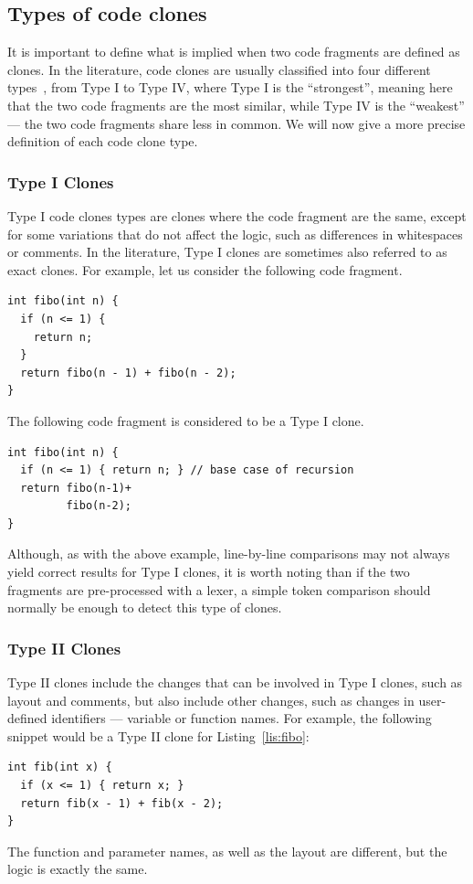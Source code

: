 \subsection{Types of code clones}
It is important to define what is implied when two code fragments are
defined as clones. In the literature, code clones are usually
classified into four different types~\cite{Roy07asurvey}, from Type I to Type IV,
where Type I is the ``strongest'', meaning here that the two code fragments are
the most similar, while Type IV is the ``weakest'' --- the two code fragments
share less in common. We will now give a more precise definition of each code
clone type.
\subsubsection{Type I Clones}
Type I code clones types are clones where the code fragment are the same,
except for some variations that do not affect the logic, such as differences
in whitespaces or comments. In the literature, Type I clones are sometimes also
referred to as exact clones.
For example, let us consider the following code fragment.
\begin{lstlisting}[caption=Fibonacci function,label=lis:fibo]
int fibo(int n) {
  if (n <= 1) {
    return n;
  }
  return fibo(n - 1) + fibo(n - 2);
}
\end{lstlisting}

The following code fragment is considered to be a Type I clone.
\begin{lstlisting}
int fibo(int n) {
  if (n <= 1) { return n; } // base case of recursion
  return fibo(n-1)+
         fibo(n-2);
}
\end{lstlisting}

Although, as with the above example, line-by-line comparisons may not always
yield correct results for Type I clones, it is worth noting than if the two
fragments are pre-processed with a lexer, a simple token comparison should
normally be enough to detect this type of clones.
\subsubsection{Type II Clones}
Type II clones include the changes that can be involved in Type I clones, such
as layout and comments, but also include other changes, such as changes in
user-defined identifiers --- variable or function names. For example, the
following snippet would be a Type II clone for Listing~\ref{lis:fibo}:
\begin{lstlisting}
int fib(int x) {
  if (x <= 1) { return x; }
  return fib(x - 1) + fib(x - 2);
}
\end{lstlisting}
The function and parameter names, as well as the layout are different, but the
logic is exactly the same.
